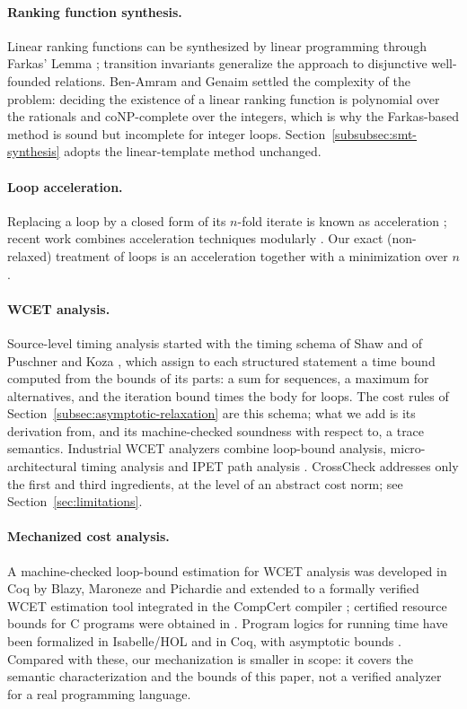 \documentclass[oneside,english]{amsart}
\numberwithin{equation}{section}
\numberwithin{figure}{section}
\theoremstyle{plain}
\theoremstyle{definition}
\theoremstyle{plain}
\theoremstyle{remark}
\theoremstyle{plain}
\theoremstyle{definition}
\theoremstyle{plain}
\theoremstyle{remark}
\begin{document}
\paragraph{Ranking function synthesis.}
Linear ranking functions can be synthesized by linear programming through Farkas' Lemma
\cite{colon2001synthesis,podelski2004complete}; transition invariants \cite{podelski2004transition} generalize the
approach to disjunctive well-founded relations. Ben-Amram and Genaim \cite{benamram2014ranking} settled the complexity of
the problem: deciding the existence of a linear ranking function is polynomial over the rationals and coNP-complete over
the integers, which is why the Farkas-based method is sound but incomplete for integer loops.
Section~\ref{subsubsec:smt-synthesis} adopts the linear-template method unchanged.

\paragraph{Loop acceleration.}
Replacing a loop by a closed form of its $n$-fold iterate is known as acceleration \cite{bardin2008fast}; recent work
combines acceleration techniques modularly \cite{frohn2020calculus}. Our exact
(non-relaxed) treatment of loops is an acceleration together with a minimization over $n$.

\paragraph{WCET analysis.}
Source-level timing analysis started with the timing schema of Shaw \cite{shaw1989reasoning} and of Puschner and Koza
\cite{puschner1989calculating}, which assign to each structured statement a time bound computed from the bounds of its
parts: a sum for sequences, a maximum for alternatives, and the iteration bound times the body for loops. The cost
rules of Section~\ref{subsec:asymptotic-relaxation} are this schema; what we add is its derivation from, and its
machine-checked soundness with respect to, a trace semantics.
Industrial WCET analyzers combine loop-bound analysis, micro-architectural timing analysis and IPET path analysis
\cite{wilhelm2008worst,li1995ilp}. CrossCheck addresses only the first and third ingredients, at the level of an abstract
cost norm; see Section~\ref{sec:limitations}.

\paragraph{Mechanized cost analysis.}
A machine-checked loop-bound estimation for WCET analysis was developed
in Coq by Blazy, Maroneze and Pichardie \cite{blazy2013formal} and extended to a formally verified WCET estimation tool
integrated in the CompCert compiler \cite{maroneze2014formally}; certified resource bounds for C programs were obtained
in \cite{carbonneaux2015compositional}. Program logics for running time have been formalized in Isabelle/HOL
\cite{haslbeck2018hoare} and in Coq, with asymptotic bounds \cite{gueneau2018fistful}. Compared with these, our
mechanization is smaller in scope: it covers the semantic characterization and the bounds of this paper, not a
verified analyzer for a real programming language.
\end{document}

